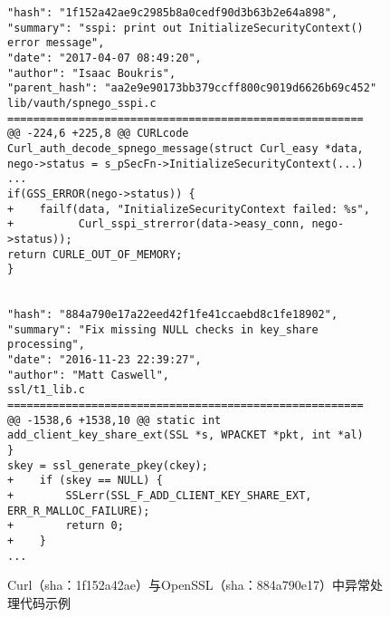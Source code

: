 \begin{figure}[b]
	\centering
\begin{lstlisting}
"hash": "1f152a42ae9c2985b8a0cedf90d3b63b2e64a898",
"summary": "sspi: print out InitializeSecurityContext() error message",
"date": "2017-04-07 08:49:20",
"author": "Isaac Boukris",
"parent_hash": "aa2e9e90173bb379ccff800c9019d6626b69c452"
lib/vauth/spnego_sspi.c
=======================================================
@@ -224,6 +225,8 @@ CURLcode Curl_auth_decode_spnego_message(struct Curl_easy *data,
nego->status = s_pSecFn->InitializeSecurityContext(...)
...
if(GSS_ERROR(nego->status)) {
+    failf(data, "InitializeSecurityContext failed: %s",
+          Curl_sspi_strerror(data->easy_conn, nego->status));
return CURLE_OUT_OF_MEMORY;
}


"hash": "884a790e17a22eed42f1fe41ccaebd8c1fe18902",
"summary": "Fix missing NULL checks in key_share processing",
"date": "2016-11-23 22:39:27",
"author": "Matt Caswell",
ssl/t1_lib.c
=======================================================
@@ -1538,6 +1538,10 @@ static int add_client_key_share_ext(SSL *s, WPACKET *pkt, int *al)
}
skey = ssl_generate_pkey(ckey);
+    if (skey == NULL) {
+        SSLerr(SSL_F_ADD_CLIENT_KEY_SHARE_EXT, ERR_R_MALLOC_FAILURE);
+        return 0;
+    }
...
\end{lstlisting}
	\caption{
	Curl（sha：1f152a42ae）与OpenSSL（sha：884a790e17）中异常处理代码示例
	}
	\label{fig:2-3-ieh-3}
\end{figure}